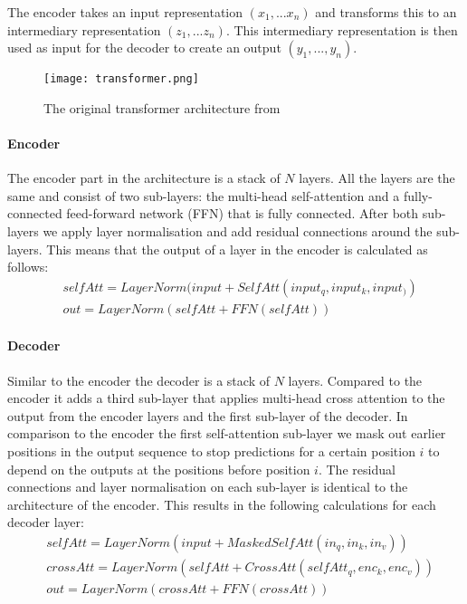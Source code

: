 The encoder takes an input representation $(x_1,...x_n)$ and transforms this to an intermediary representation $(z_1,...z_n)$. This intermediary representation is then used as input for the decoder to create an output $(y_1,...,y_n)$.

\begin{figure}[h]
\caption{The original transformer architecture from \cite{vaswani_attention_2017}}
\centering
\texttt{[image: transformer.png]}
\label{fig:transformer-architecture}
\end{figure}

\paragraph{Encoder}
The encoder part in the architecture is a stack of $N$ layers. All the layers are the same and consist of two sub-layers: the multi-head self-attention and a fully-connected feed-forward network (FFN) that is fully connected. After both sub-layers we apply layer normalisation\cite{ba_layer_2016} and add residual connections\cite{he_deep_2015} around the sub-layers. This means that the output of a layer in the encoder is calculated as follows: 
\begin{align*}
&selfAtt = LayerNorm(input + SelfAtt(input_q, input_k, input_))\\
&out = LayerNorm(selfAtt + FFN(selfAtt))
\end{align*}


\paragraph{Decoder}
Similar to the encoder the decoder is a stack of $N$ layers. Compared to the encoder it adds a third sub-layer that applies multi-head cross attention to the output from the encoder layers and the first sub-layer of the decoder. In comparison to the encoder the first self-attention sub-layer we mask out earlier positions in the output sequence to stop predictions for a certain position $i$ to depend on the outputs at the positions before position $i$. The residual connections and layer normalisation on each sub-layer is identical to the architecture of the encoder. This results in the following calculations for each decoder layer: 
\begin{align*}
&selfAtt = LayerNorm(input + MaskedSelfAtt(in_q, in_k, in_v))\\
&crossAtt = LayerNorm(selfAtt + CrossAtt(selfAtt_q, enc_k, enc_v))\\
&out = LayerNorm(crossAtt + FFN(crossAtt))
\end{align*}

